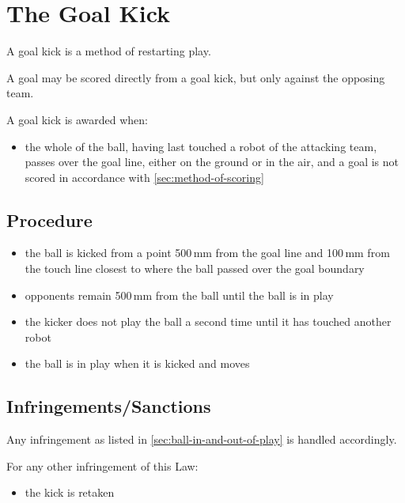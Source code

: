 \section{The Goal Kick}\label{sec:goal-kick}

A goal kick is a method of restarting play.

A goal may be scored directly from a goal kick, but only against the opposing team.

A goal kick is awarded when:

\begin{itemize}
\item the whole of the ball, having last touched a robot of the attacking team, passes over the goal line, either on the ground or in the air, and a goal is not scored in accordance with \autoref{sec:method-of-scoring}
\end{itemize}

\subsection{Procedure}
\begin{itemize}
\item the ball is kicked from a point 500\,mm from the goal line and 100\,mm from the touch line closest to where the ball passed over the goal boundary
\item opponents remain 500\,mm from the ball until the ball is in play
\item the kicker does not play the ball a second time until it has touched another robot
\item the ball is in play when it is kicked and moves
\end{itemize}

\subsection{Infringements/Sanctions}
Any infringement as listed in \autoref{sec:ball-in-and-out-of-play} is handled accordingly.

For any other infringement of this Law:
\begin{itemize}
\item the kick is retaken
\end{itemize}